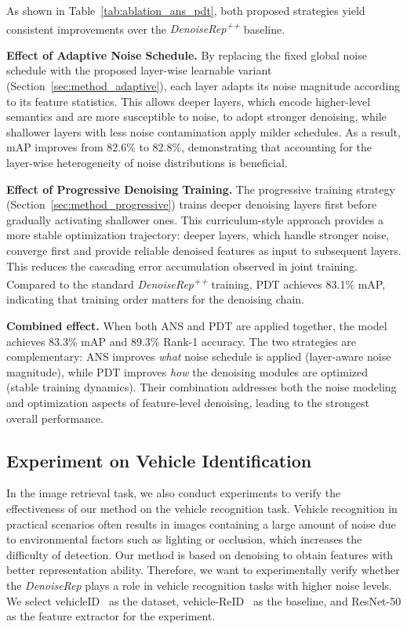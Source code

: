 \documentclass[conference]{IEEEtran}
\begin{document}
{{As shown in Table~\ref{tab:ablation_ans_pdt}, both proposed strategies yield consistent improvements over the \textit{DenoiseRep\textsuperscript{++}} baseline.

\textbf{Effect of Adaptive Noise Schedule.}
By replacing the fixed global noise schedule with the proposed layer-wise learnable variant (Section~\ref{sec:method_adaptive}), each layer adapts its noise magnitude according to its feature statistics. This allows deeper layers, which encode higher-level semantics and are more susceptible to noise, to adopt stronger denoising, while shallower layers with less noise contamination apply milder schedules. As a result, mAP improves from 82.6\% to 82.8\%, demonstrating that accounting for the layer-wise heterogeneity of noise distributions is beneficial.

\textbf{Effect of Progressive Denoising Training.}
The progressive training strategy (Section~\ref{sec:method_progressive}) trains deeper denoising layers first before gradually activating shallower ones. This curriculum-style approach provides a more stable optimization trajectory: deeper layers, which handle stronger noise, converge first and provide reliable denoised features as input to subsequent layers. This reduces the cascading error accumulation observed in joint training. Compared to the standard \textit{DenoiseRep\textsuperscript{++}} training, PDT achieves 83.1\% mAP, indicating that training order matters for the denoising chain.

\textbf{Combined effect.}
When both ANS and PDT are applied together, the model achieves 83.3\% mAP and 89.3\% Rank-1 accuracy. The two strategies are complementary: ANS improves \textit{what} noise schedule is applied (layer-aware noise magnitude), while PDT improves \textit{how} the denoising modules are optimized (stable training dynamics). Their combination addresses both the noise modeling and optimization aspects of feature-level denoising, leading to the strongest overall performance.
}%


\subsection{Experiment on Vehicle Identification} 
\label{sec: Experiment on Vehicle Identification}
In the image retrieval task, we also conduct experiments to verify the effectiveness of our method on the vehicle recognition task. Vehicle recognition in practical scenarios often results in images containing a large amount of noise due to environmental factors such as lighting or occlusion, which increases the difficulty of detection. Our method is based on denoising to obtain features with better representation ability. Therefore, we want to experimentally verify whether the \textit{DenoiseRep} plays a role in vehicle recognition tasks with higher noise levels. We select vehicleID~\cite{liu2016deep} as the dataset, vehicle-ReID~\cite{chu2019vehicle} as the baseline, and ResNet-50 as the feature extractor for the experiment.

}
\end{document}
